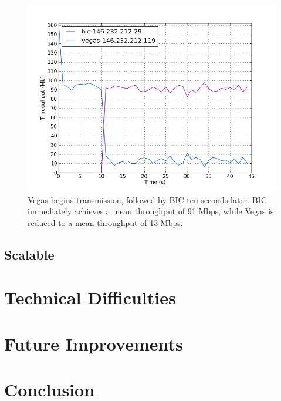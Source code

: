 \documentclass[11pt,a4paper,twocolumn]{article}
\begin{document}
\begin{figure}[p]
	\includegraphics[width=\linewidth]{exp44.png}
	\caption{Vegas begins transmission, followed by BIC ten seconds later. BIC immediately achieves a mean throughput of
		91 Mbps, while Vegas is reduced to a mean throughput of 13 Mbps.}
	\label{fig:vegas_reno}
\end{figure}

\subsection{Scalable}
\label{subsec:scalable}

\section{Technical Difficulties}
\label{sec:diff}

\section{Future Improvements}
\label{sec:imp}

\section{Conclusion}
\label{sec:conc}




\end{document}
